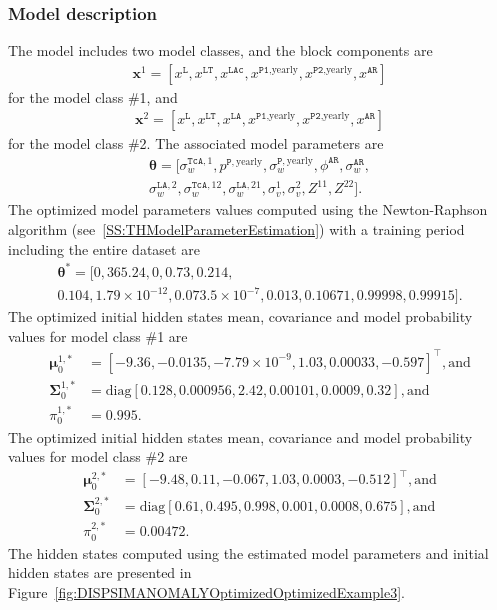 \subsubsection{Model description}
\label{SS:ModelConstructionExample3}
The model includes two model classes, and the block components are 
\begin{gather*}
\mathbf{x}^{1}=[x^{\mathtt{L}}, x^{\mathtt{LT}}, x^{\mathtt{LAc}}, x^{\mathtt{P1}\text{,yearly}} , x^{\mathtt{P2}\text{,yearly}}, x^{\mathtt{AR}}]
 \end{gather*}
for the model class \#1, and
\begin{gather*}
\mathbf{x}^{2}=[x^{\mathtt{L}}, x^{\mathtt{LT}}, x^{\mathtt{LA}}, x^{\mathtt{P1}\text{,yearly}} , x^{\mathtt{P2}\text{,yearly}}, x^{\mathtt{AR}}]
 \end{gather*}
for the model class \#2.
The associated model parameters are
\begin{gather*}
\bm\theta=[\sigma_{w}^{\mathtt{TcA},1}, p^{\mathtt{P}, \text{yearly}}, \sigma_{w}^{\mathtt{P}, \text{yearly}}, \phi^{\mathtt{AR}}, \sigma_{w}^{\mathtt{AR}}, \\
 \sigma_{w}^{\mathtt{LA},2}, \sigma_{w}^{\mathtt{TcA}, 12}, \sigma_{w}^{\mathtt{LA}, 21}, \sigma^{1}_{v}, \sigma^{2}_{v}, Z^{11},   Z^{22}] \text{.}
 \end{gather*}
The optimized model parameters values computed using the Newton-Raphson algorithm (see~\ref{SS:THModelParameterEstimation}) with a training period including the entire dataset are
\begin{gather*}
\bm\theta^{\text{*}}=[0, 365.24, 0, 0.73, 0.214, \\
0.104, 1.79\times10^{-12}, 0.07 3.5\times10^{-7}, 0.013, 0.10671, 0.99998, 0.99915].
\end{gather*}
The optimized initial hidden states mean, covariance  and model probability values for model class \#1 are 
\begin{align*}
 \bm \mu^{1,\text{*}}_{0} & = [	-9.36 ,	-0.0135	, -7.79\times 10^{-9}	, 1.03  ,	0.00033	, -0.597    ]^{\intercal}, \text{and} \\
\bm\Sigma^{1,\text{*}}_{0}  & = \text{diag}[	0.128 ,	0.000956,	2.42	,0.00101, 0.0009,	0.32     ],  \text{and} \\
 \pi_{0}^{1,\text{*}} & = 0.995.
\end{align*}
The optimized initial hidden states mean, covariance  and model probability values for model class \#2 are 
\begin{align*}
 \bm \mu^{2,\text{*}}_{0} & = [	-9.48 ,	0.11 ,	-0.067	,  1.03  ,	0.0003, 	-0.512     ]^{\intercal}, \text{and} \\
 \bm\Sigma^{2,\text{*}}_{0}  & = \text{diag}[	0.61 	,0.495 ,	0.998 ,	0.001,	0.0008	, 0.675    ], \text{and} \\
 \pi_{0}^{2,\text{*}} & = 0.00472.
\end{align*}
The hidden states computed using the estimated model parameters and initial hidden states are presented in Figure~\ref{fig:DISPSIMANOMALYOptimizedOptimizedExample3}.


